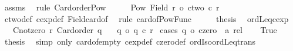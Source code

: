 \begin{isabellebody}
\ assms\ \isamarkupfalse%
\ {\isacharparenleft}{\kern0pt}rule\ Card{\isacharunderscore}{\kern0pt}order{\isacharunderscore}{\kern0pt}Pow{\isacharparenright}{\kern0pt}\isanewline
\ \ \isamarkupfalse%
\ \isamarkupfalse%
\ {\isachardoublequoteopen}{\isacharbar}{\kern0pt}Pow\ {\isacharparenleft}{\kern0pt}Field\ r{\isacharparenright}{\kern0pt}{\isacharbar}{\kern0pt}\ {\isacharequal}{\kern0pt}o\ ctwo\ {\isacharcircum}{\kern0pt}c\ r{\isachardoublequoteclose}\isanewline
\ \ \ \ \isamarkupfalse%
\ ctwo{\isacharunderscore}{\kern0pt}def\ cexp{\isacharunderscore}{\kern0pt}def\ Field{\isacharunderscore}{\kern0pt}card{\isacharunderscore}{\kern0pt}of\ \isamarkupfalse%
\ {\isacharparenleft}{\kern0pt}rule\ card{\isacharunderscore}{\kern0pt}of{\isacharunderscore}{\kern0pt}Pow{\isacharunderscore}{\kern0pt}Func{\isacharparenright}{\kern0pt}\isanewline
\ \ \isamarkupfalse%
\ \isamarkupfalse%
\ {\isacharquery}{\kern0pt}thesis\ \isacommand{{\isachardot}{\kern0pt}}\isamarkupfalse%
\isanewline
{}\isamarkupfalse%
%
\endisatagproof
{\isafoldproof}%
%
\isadelimproof
\isanewline
%
\endisadelimproof
\isanewline
{}\isamarkupfalse%
\ ordLeq{\isacharunderscore}{\kern0pt}cexp{}{\isacharcolon}{\kern0pt}\isanewline
\ \ \ {\isachardoublequoteopen}Cnotzero\ r{\isachardoublequoteclose}\ {\isachardoublequoteopen}Card{\isacharunderscore}{\kern0pt}order\ q{\isachardoublequoteclose}\isanewline
\ \ \ {\isachardoublequoteopen}q\ {\isasymle}o\ q\ {\isacharcircum}{\kern0pt}c\ r{\isachardoublequoteclose}\isanewline
%
\isadelimproof
%
\endisadelimproof
%
\isatagproof
{}\isamarkupfalse%
\ {\isacharparenleft}{\kern0pt}cases\ {\isachardoublequoteopen}q\ {\isacharequal}{\kern0pt}o\ {\isacharparenleft}{\kern0pt}czero\ {\isacharcolon}{\kern0pt}{\isacharcolon}{\kern0pt}\ {\isacharprime}{\kern0pt}a\ rel{\isacharparenright}{\kern0pt}{\isachardoublequoteclose}{\isacharparenright}{\kern0pt}\isanewline
\ \ \isamarkupfalse%
\ True\ \isamarkupfalse%
\ {\isacharquery}{\kern0pt}thesis\ \isamarkupfalse%
\ {\isacharparenleft}{\kern0pt}simp\ only{\isacharcolon}{\kern0pt}\ card{\isacharunderscore}{\kern0pt}of{\isacharunderscore}{\kern0pt}empty\ cexp{\isacharunderscore}{\kern0pt}def\ czero{\isacharunderscore}{\kern0pt}def\ ordIso{\isacharunderscore}{\kern0pt}ordLeq{\isacharunderscore}{\kern0pt}trans{\isacharparenright}{\kern0pt}\isanewline
{}\isamarkupfalse%

\end{isabellebody}
